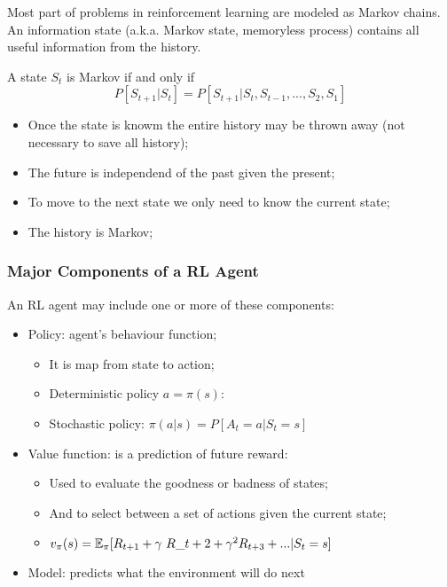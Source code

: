 \begin{frame}

    Most part of problems in reinforcement learning are {\color{red}modeled as Markov chains}.
    An information state (a.k.a. Markov state, memoryless process) contains all useful information from the history.

    \begin{definition}
        A state $S_t$ is Markov if and only if 
        $$P[S_{t+1}|S_t] = P[S_{t+1}|S_t, S_{t-1},...,S_2,S_1]$$
    \end{definition}

    \begin{itemize}
        \item Once the state is knowm the entire history may be thrown away (not necessary to save all history);
        \item The future is independend of the past given the present;
        \item {\color{red}To move to the next state we only need to know the current state;}
        \item The history is Markov;

    \end{itemize}

\end{frame}



\begin{frame}
    \frametitle{Major Components of a RL Agent}

    An RL agent may include one or more of these components:
    \begin{itemize}
        \item Policy: agent's behaviour function;
        \begin{itemize}
            \item It is map from state to action;
            \item Deterministic policy $a = \pi(s)$:
            \item Stochastic policy: $\pi(a|s) = P[A_t=a|S_t=s]$
        \end{itemize}
        \item Value function: is a prediction of {\color{red}future reward}:
        \begin{itemize}
            \item Used to evaluate the goodness or badness of states;
            \item And to select between a set of actions given the current state;
            \item $v_{\pi}(s) = \operatorname*{\mathbb{E}}_{\pi}[R_{t+1}+\gamma~R\_{t+2}+\gamma^{2}R_{t+3}+...|S_t=s]$
        \end{itemize}   

        \item Model: predicts what the environment will do next

    \end{itemize}

\end{frame}


